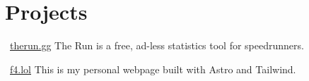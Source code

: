 \section{Projects}

\resumeSubHeadingListStart

	\resumeSubheading
		{\faGlobe \ \href{https://therun.gg}{\underline{therun.gg}}}{}
		{\qquad The Run is a free, ad-less statistics tool for speedrunners.}{}
		\resumeItemListStart
		\resumeItemListEnd

	\resumeSubheading
		{\faGlobe \ \href{https://f4.lol}{\underline{f4.lol}}}{}
		{\qquad This is my personal webpage built with Astro and Tailwind.}{}
		\resumeItemListStart
		\resumeItemListEnd

\resumeSubHeadingListEnd